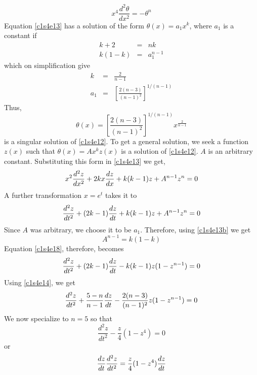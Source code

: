 \begin{itemize}
\begin{equation}
x^4\frac{d^2\theta}{dx^2} = -\theta^n
\end{equation}
Equation \eqref{c1s4e13} has a solution of the form $\theta(x) = a_1x^k$, where $a_1$ is a constant if
\begin{eqnarray}
k + 2&=& nk \label{c1s4e13a} \\
k(1 - k) &=& a_1^{n-1} \label{c1s4e13b}
\end{eqnarray}
which on simplification give
\begin{eqnarray}
k &=& \frac{2}{n - 1} \label{c1s4e14} \\
a_1 &=& \left[\frac{2(n - 3)}{(n - 1)^2}\right]^{1/(n - 1)} \label{c1s4e15}
\end{eqnarray}
Thus,
\begin{equation}\label{c1s4e16}
\theta(x) = \left[\frac{2(n - 3)}{(n - 1)^2}\right]^{1/(n - 1)} x^{\frac{2}{n - 1}}
\end{equation}
is a singular solution of \eqref{c1s4e12}. To get a general solution, we seek a function $z(x)$ such that $\theta(x) = Ax^k z(x)$ is a solution of \eqref{c1s4e12}. $A$ is an arbitrary 
constant. Substituting this form
in \eqref{c1s4e13} we get,
\begin{equation}\label{c1s4e17}
x^2\frac{d^2z}{dx^2} + 2kx\frac{d{z}}{d{x}} + k(k - 1)z + A^{n - 1}z^n = 0
\end{equation}
A further transformation $x = e^t$ takes it to
\begin{equation}\label{c1s4e18}
\frac{d^2z}{dt^2} + (2k - 1)\frac{d{z}}{d{t}} + k(k - 1)z + A^{n - 1}z^n = 0
\end{equation}
Since $A$ was arbitrary, we choose it to be $a_1$. Therefore, using \eqref{c1s4e13b} we get
\begin{equation}\label{c1s4e19}
A^{n - 1} = k(1 - k)
\end{equation}
Equation \eqref{c1s4e18}, therefore, becomes
\begin{equation}\label{c1s4e20}
\frac{d^2z}{dt^2} + (2k - 1)\frac{d{z}}{d{t}} - k(k - 1)z(1 - z^{n - 1}) = 0
\end{equation}
Using \eqref{c1s4e14}, we get
\begin{equation}\label{c1s4e21}
\frac{d^2z}{dt^2} + \frac{5 - n}{n - 1}\frac{d{z}}{d{t}} - \frac{2(n - 3)}{(n - 1)^2}z(1 - z^{n - 1}) = 0
\end{equation}
We now specialize to $n = 5$ so that
\begin{equation}\label{c1s4e22}
\frac{d^2z}{dt^2} - \frac{z}{4}(1 - z^4) = 0
\end{equation}
or
\[
\frac{d{z}}{d{t}}\frac{d^2z}{dt^2} = \frac{z}{4}(1 - z^4)\frac{d{z}}{d{t}}
\]
\end{itemize}
